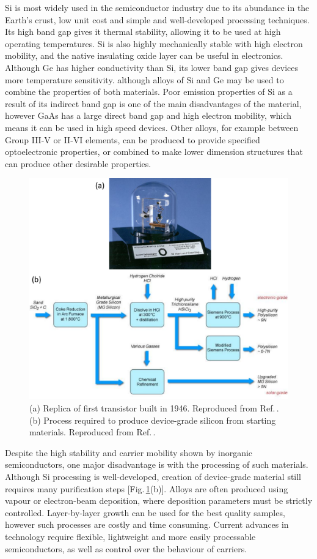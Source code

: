 Si is most widely used in the semiconductor industry due to its abundance in the Earth's crust, low unit cost and simple and well-developed processing techniques. Its high band gap gives it thermal stability, allowing it to be used at high operating temperatures. Si is also highly mechanically stable with high electron mobility, and the native insulating oxide layer can be useful in electronics. Although Ge has higher conductivity than Si, its lower band gap gives devices more temperature sensitivity. although alloys of Si and Ge may be used to combine the properties of both materials. Poor emission properties of Si as a result of its indirect band gap is one of the main disadvantages of the material, however GaAs has a large direct band gap and high electron mobility, which means it can be used in high speed devices. Other alloys, for example between Group III-V or II-VI elements, can be produced to provide specified optoelectronic properties, or combined to make lower dimension structures that can produce other desirable properties.
\begin{figure}[h!]
\centering
\includegraphics[width=\textwidth]{Fig1}
\caption{(a) Replica of first transistor built in 1946. Reproduced from Ref.\,\cite{Transistor}. (b) Process required to produce device-grade silicon from starting materials. Reproduced from Ref.\,\cite{Silicon}.}
\label{1Fig1}
\end{figure}

Despite the high stability and carrier mobility shown by inorganic semiconductors, one major disadvantage is with the processing of such materials. Although Si processing is well-developed, creation of device-grade material still requires many purification steps [Fig.\,\ref{1Fig1}(b)]. Alloys are often produced using vapour or electron-beam deposition, where deposition parameters must be strictly controlled. Layer-by-layer growth can be used for the best quality samples, however such processes are costly and time consuming. Current advances in technology require flexible, lightweight and more easily processable semiconductors, as well as control over the behaviour of carriers. 

